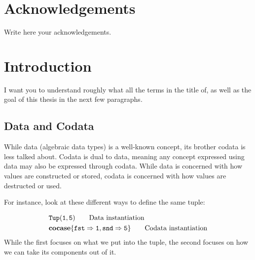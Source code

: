 \documentclass[twoside,12pt,a4paper]{article}
\begin{document}
\section*{Acknowledgements}

Write here your acknowledgements.

\cleardoublepage


\renewcommand{\baselinestretch}{1.3}
\small\normalsize

\tableofcontents

\renewcommand{\baselinestretch}{1}
\small\normalsize

\listoftheorems

\cleardoublepage


\setcounter{page}{1}

\section{Introduction}

I want you to understand roughly what all the terms in the title of,
as well as the goal of this thesis in the next few paragraphs. 

\subsection{Data and Codata}
While data (algebraic data types) is a well-known concept, 
its brother codata is less talked about. Codata is dual to data, meaning any concept expressed using data may also be expressed through codata. 
While data is concerned with how values are constructed or stored, codata is concerned with how values are destructed or used. 

For instance, look at these different ways to define the same tuple: 

\begin{example}
    \begin{align*}
        &\mathtt{Tup(}\mathtt{1,5}\mathtt{)} \tag*{Data instantiation}\\
        &\textbf{cocase}\{\mathtt{fst \Rightarrow 1}, \mathtt{snd \Rightarrow 5}\} \tag*{Codata instantiation}
    \end{align*}     
    While the first focuses on what we put into the tuple, the second focuses on how we can take its components out of it.   
\end{example}
\end{document}
